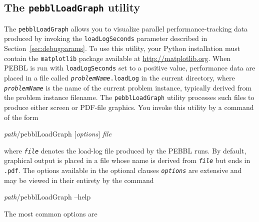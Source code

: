 \subsection{The \texttt{pebblLoadGraph} utility}
\label{sec:pebblLoadGraph}
The \texttt{pebblLoadGraph} allows you to visualize parallel
performance-tracking data produced by invoking the
\texttt{loadLogSeconds} parameter described in
Section~\ref{sec:debugparams}.  To use this utility, your Python
installation must contain the \texttt{matplotlib} package available at
\url{http://matplotlib.org}.  When PEBBL is run with
\texttt{loadLogSeconds} set to a positive value, performance data are
placed in a file called \texttt{\textit{problemName}.loadLog} in the
current directory, where \texttt{\textit{problemName}} is the name of
the current problem instance, typically derived from the problem
instance filename.  The \texttt{pebblLoadGraph} utility processes such
files to produce either screen or PDF-file graphics.  You invoke this
utility by a command of the form
\begin{codeblock}
\textit{path}/pebblLoadGraph \textrm{[}\textit{options}\textrm{]} 
\textit{file}
\end{codeblock}
where \texttt{\textit{file}} denotes the load-log file produced by the
PEBBL runs.  By default, graphical output is placed in a file whose
name is derived from \texttt{\textit{file}} but ends in \texttt{.pdf}.
The options available in the optional clauses
\texttt{\textit{options}} are extensive and may be viewed in their
entirety by the command
\begin{codeblock}
\textit{path}/pebblLoadGraph --help
\end{codeblock}
The most common options are
